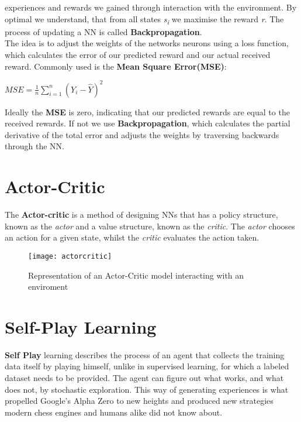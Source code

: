 experiences and rewards we gained through interaction with the environment.
By optimal we understand, that from all states \textit{s\textsubscript{i}} we maximise the reward \textit{r}.
\newline
The process of updating a NN is called \textbf{Backpropagation}.\\
The idea is to adjust the weights of the networks neurons using a loss function, which calculates the error of our
predicted reward and our actual received reward.
Commonly used is the \textbf{Mean Square Error(MSE)}:
\begin{center}
    \begin{math}
        \boxed{
            MSE = \frac{1}{n} \sum_{i=1}^n(Y_{i}-\hat Y)^2
        }
    \end{math}
\end{center}
Ideally the \textbf{MSE} is zero, indicating that our predicted rewards are equal to the received rewards.
If not we use \textbf{Backpropagation}, which calculates the partial derivative of the total error and adjusts the
weights by traversing backwards through the NN.


\section{Actor-Critic}
The \textbf{Actor-critic} is a method of designing NNs that has a policy structure, known as the \textit{actor}
and a value structure, known as the \textit{critic}.
The \textit{actor} chooses an action for a given state, whilst the \textit{critic} evaluates the action taken.
\begin{figure}[!ht]
    \centering
    \texttt{[image: actorcritic]}
    \caption{Representation of an Actor-Critic model interacting with an enviroment \cite{actorcritic}}
\end{figure}


\section{Self-Play Learning}
\textbf{Self Play} learning describes the process of an agent that collects the training data itself by playing
himself, unlike in supervised learning, for which a labeled dataset needs to be provided.
The agent can figure out what works, and what does not, by stochastic exploration.
This way of generating experiences is what propelled Google's Alpha Zero to new heights and produced new strategies
modern chess engines and humans alike did not know about.\cite{Silver2017}


